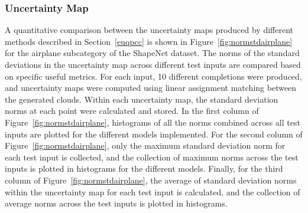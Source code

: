         \subsubsection{Uncertainty Map}
        A quantitative comparison between the uncertainty maps produced by different methods described in Section~\ref{euqpcc} is shown in Figure~\ref{fig:normstdairplane} for the airplane subcategory of the ShapeNet dataset. The norms of the standard deviations in the uncertainty map across different test inputs are compared based on specific useful metrics. For each input, 10 different completions were produced, and uncertainty maps were computed using linear assignment matching between the generated clouds. Within each uncertainty map, the standard deviation norms at each point were calculated and stored. In the first column of Figure~\ref{fig:normstdairplane}, histograms of all the norms combined across all test inputs are plotted for the different models implemented. For the second column of Figure~\ref{fig:normstdairplane}, only the maximum standard deviation norm for each test input is collected, and the collection of maximum norms across the test inputs is plotted in histograms for the different models. Finally, for the third column of Figure~\ref{fig:normstdairplane}, the average of standard deviation norms within the uncertainty map for each test input is calculated, and the collection of average norms across the test inputs is plotted in histograms.
